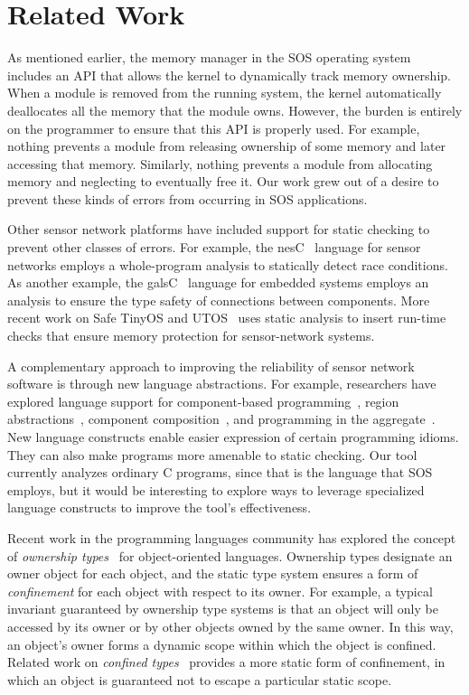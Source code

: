 \section{Related Work}
\label{sec:related}


As mentioned earlier, the memory manager in the SOS operating
system~\cite{sos} includes an API that allows the kernel
to dynamically track memory ownership.  When a module is removed from the
running system, the kernel automatically deallocates all the memory that the
module owns.  However, the burden is entirely on the programmer to
ensure that this API is properly used.  For
example, nothing prevents a
module from releasing ownership of some memory and later accessing
that memory.  
Similarly, nothing prevents a module from allocating memory
and neglecting to eventually free it.  
Our work grew out of a desire to
prevent these kinds of errors from occurring in SOS applications.


Other sensor network platforms have included support for static
checking to prevent other classes of errors.  For example, the
nesC~\cite{nesC} language for sensor networks employs a whole-program
analysis to statically detect race conditions.  As another example,
the galsC~\cite{TinyGALS, galsC} language for embedded systems employs
an analysis to ensure the type safety of connections between
components.  More recent work on Safe TinyOS and
UTOS~\cite{regehr06memory} uses static analysis to insert run-time
checks that ensure memory protection for sensor-network systems.

A complementary approach to improving the reliability of sensor
network software is through new language abstractions.  For example,
researchers have explored language support for component-based
programming~\cite{TinyOS,nesC,galsC}, region
abstractions~\cite{conf/mobisys/WhitehouseSCB04,conf/nsdi/WelshM04},
component composition~\cite{conf/sensys/GreensteinKE04}, and
programming in the aggregate~\cite{1052213,conf/dcoss/GummadiGG05}.
New language constructs enable easier expression of certain
programming idioms.  They can also make programs more amenable to
static checking.  Our tool currently analyzes ordinary C programs,
since that is the language that SOS employs, but it would be
interesting to explore ways to leverage specialized language
constructs to improve the tool's effectiveness.


Recent work in the programming languages community has explored the
concept of {\em ownership
types}~\cite{ownership,ownership2,BoyapatiEtAl02,aliasjava} for
object-oriented languages.  Ownership types designate an owner object
for each object, and the static type system ensures a form of {\em
confinement} for each object with respect to its owner.  For example,
a typical invariant guaranteed by ownership type systems is that an
object will only be accessed by its owner or by other objects owned by
the same owner.  In this way, an object's owner forms a dynamic scope
within which the object is confined.  Related work on {\em confined
types}~\cite{confined1,confined2} provides a more static form of
confinement, in which an object is guaranteed not to escape a
particular static scope.


